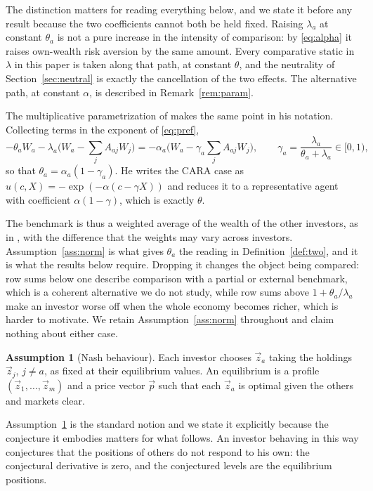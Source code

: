 \documentclass[12pt]{article}
\theoremstyle{definition}
\newtheorem{assumption}{Assumption}
\theoremstyle{remark}
\begin{document}
The distinction matters for reading everything below, and we state it before
any result because the two coefficients cannot both be held fixed. Raising
$\lambda_a$ at constant $\theta_a$ is not a pure increase in the intensity of
comparison: by \eqref{eq:alpha} it raises own-wealth risk aversion by the same
amount. Every comparative static in $\lambda$ in this paper is taken along that
path, at constant $\theta$, and the neutrality of Section~\ref{sec:neutral} is
exactly the cancellation of the two effects. The alternative path, at constant
$\alpha$, is described in Remark~\ref{rem:param}.

The multiplicative parametrization of \cite{gomez} makes the same point in his
notation. Collecting terms in the exponent of \eqref{eq:pref},
%
\begin{equation}
-\theta_aW_a-\lambda_a\Big(W_a-\sum_jA_{aj}W_j\Big)
=-\alpha_a\Big(W_a-\gamma_a\sum_jA_{aj}W_j\Big),
\qquad \gamma_a=\frac{\lambda_a}{\theta_a+\lambda_a}\in[0,1),
\label{eq:param}
\end{equation}
%
so that $\theta_a=\alpha_a(1-\gamma_a)$. He writes the CARA case as
$u(c,X)=-\exp(-\alpha(c-\gamma X))$ and reduces it to a representative agent
with coefficient $\alpha(1-\gamma)$, which is exactly $\theta$.

The benchmark is thus a weighted average of the wealth of the other investors,
as in \cite{gomez}, with the difference that the weights may vary across
investors. Assumption~\ref{ass:norm} is what gives $\theta_a$ the reading in
Definition~\ref{def:two}, and it is what the results below require. Dropping it changes the object
being compared: row sums below one describe comparison with a partial or
external benchmark, which is a coherent alternative we do not study, while row
sums above $1+\theta_a/\lambda_a$ make an investor worse off when the whole
economy becomes richer, which is harder to motivate. We retain
Assumption~\ref{ass:norm} throughout and claim nothing about either case.

\begin{assumption}[Nash behaviour]
\label{ass:nash}
Each investor chooses $\vec z_a$ taking the holdings $\vec z_j$, $j\neq a$,
as fixed at their equilibrium values. An equilibrium is a profile
$(\vec z_1,\dots,\vec z_m)$ and a price vector $\vec p$ such that each
$\vec z_a$ is optimal given the others and markets clear.
\end{assumption}

Assumption~\ref{ass:nash} is the standard notion and we state it explicitly
because the conjecture it embodies matters for what follows. An investor
behaving in this way conjectures that the positions of others do not respond to
his own: the conjectural derivative is zero, and the conjectured levels are the
equilibrium positions.
\end{document}
